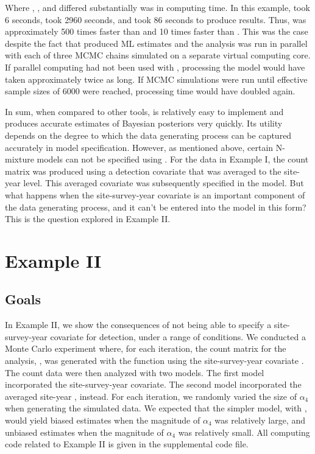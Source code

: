 \documentclass[codesnippet]{jss}
\begin{document}
Where , , and  differed substantially was in computing time. In this example,  took 6 seconds,  took 2960 seconds, and  took 86 seconds to produce results. Thus,  was approximately 500 times faster than  and 10 times faster than . This was the case despite the fact that  produced ML estimates and the  analysis was run in parallel with each of three MCMC chains simulated on a separate virtual computing core. If parallel computing had not been used with , processing the  model would have taken approximately twice as long. If MCMC simulations were run until effective sample sizes of 6000 were reached, processing time would have doubled again.

In sum, when compared to other tools,  is relatively easy to implement and produces accurate estimates of Bayesian posteriors very quickly. Its utility depends on the degree to which the data generating process can be captured accurately in model specification. However, as mentioned above, certain N-mixture models can not be specified using . For the data in Example I, the count matrix was produced using a detection covariate that was averaged to the site-year level. This averaged covariate was subsequently specified in the model. But what happens when the site-survey-year covariate is an important component of the data generating process, and it can't be entered into the model in this form? This is the question explored in Example II.

\section[Example II]{Example II}
\subsection[Goals]{Goals}
In Example II, we show the consequences of not being able to specify a site-survey-year covariate for detection, under a range of conditions. We conducted a Monte Carlo experiment where, for each iteration, the count matrix for the analysis, , was generated with the  function using the site-survey-year covariate . The count data were then analyzed with two  models. The first model incorporated the site-survey-year  covariate. The second model incorporated the averaged site-year , instead. For each iteration, we randomly varied the size of $\alpha_4$ when generating the simulated data. We expected that the simpler model, with , would yield biased estimates when the magnitude of $\alpha_4$ was relatively large, and unbiased estimates when the magnitude of $\alpha_4$ was relatively small. All computing code related to Example II is given in the supplemental code file.
\end{document}
